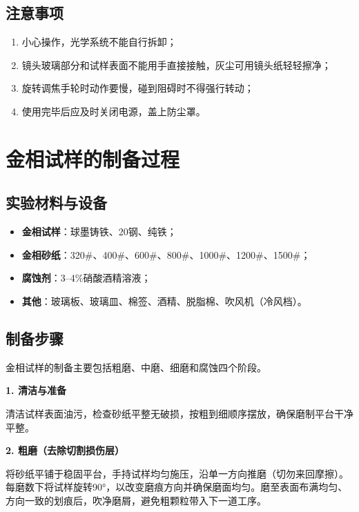 \subsection{注意事项}

\begin{enumerate}[label=（\arabic*）, leftmargin=4em, labelsep=0pt]
    \item 小心操作，光学系统不能自行拆卸；
    \item 镜头玻璃部分和试样表面不能用手直接接触，灰尘可用镜头纸轻轻擦净；
    \item 旋转调焦手轮时动作要慢，碰到阻碍时不得强行转动；
    \item 使用完毕后应及时关闭电源，盖上防尘罩。
\end{enumerate}


\section{金相试样的制备过程}

\subsection{实验材料与设备}

\begin{itemize}[leftmargin=2em]
    \item \textbf{金相试样}：球墨铸铁、20钢、纯铁；
    \item \textbf{金相砂纸}：320\#、400\#、600\#、800\#、1000\#、1200\#、1500\#；
    \item \textbf{腐蚀剂}：3--4\%硝酸酒精溶液；
    \item \textbf{其他}：玻璃板、玻璃皿、棉签、酒精、脱脂棉、吹风机（冷风档）。
\end{itemize}

\subsection{制备步骤}

金相试样的制备主要包括粗磨、中磨、细磨和腐蚀四个阶段。

\textbf{1. 清洁与准备}

清洁试样表面油污，检查砂纸平整无破损，按粗到细顺序摆放，确保磨制平台干净平整。

\textbf{2. 粗磨（去除切割损伤层）}

将砂纸平铺于稳固平台，手持试样均匀施压，沿单一方向推磨（切勿来回摩擦）。每磨数下将试样旋转90°，以改变磨痕方向并确保磨面均匀。磨至表面布满均匀、方向一致的划痕后，吹净磨屑，避免粗颗粒带入下一道工序。

